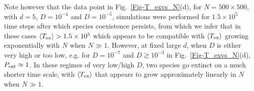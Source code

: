 \documentclass[aps, pre, twocolumn, amsmath, superscriptaddress,showkeys,showpacs]{revtex4-1}
\begin{document}
{{{Note however that the  data point in  Fig.~\ref{Fig-T_exvs_N}(d), for $N=500\times 500$, with $d=5$, 
 $D=10^{-4}$ and $D=10^{-5}$, simulations were performed for $1.5\times 10^{5}$ time steps after which species coexistence persists, from which we infer that in these cases $\langle T_{\rm ex}\rangle>1.5\times 10^{5}$ which appears to be compatible with $\langle T_{\rm ex}\rangle$ growing exponentially with $N$ when $N\gg 1$. 
However, at fixed large $d$, when $D$ is either very high or too low, e.g. for $D=10^{-7}$ and $D\gtrsim 10^{-3}$ in Fig.~\ref{Fig-T_exvs_N}(d), $P_{\rm ext}\approx 1$. In these regimes of very low/high $D$, two species go extinct on a much shorter time scale, with $\langle T_{\rm ex}\rangle$ that appears  
to grow approximately linearly in $N$ when $N\gg 1$.

}

 


	

}}
\end{document}
